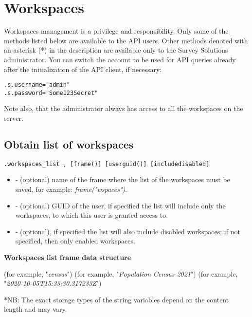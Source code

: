 \section{Workspaces}


Workspaces management is a privilege and responsibility. Only some of the
methods listed below are available to the API users. Other methods denoted
with an asterisk (*) in the description are available only to the Survey
Solutions administrator. You can switch the account to be used for API
queries already after the initialization of the API client, if necessary:

\vskip16pt

\begin{lstlisting}[style=CommandLineStyle]
.s.username="admin"
.s.password="Some123Secret"
\end{lstlisting}

Note also, that the administrator always has access to all the workspaces on
the server.


\subsection{Obtain list of workspaces}

\begin{lstlisting}[style=CommandLineStyle]
.workspaces_list , [frame()] [userguid()] [includedisabled]
\end{lstlisting}

\optsheader
\begin{itemize}
  \item {} - (optional) name of the frame where the list of the
        workspaces must be saved, for example: \textit{frame("wspaces")}.
  \item {} - (optional) GUID of the user, if specified the
        list will include only the workspaces, to which this user is granted
        access to.
  \item {} - (optional), if specified the list will also
        include disabled workspaces; if not specified, then only enabled
        workspaces.
\end{itemize}

\textbf{Workspaces list frame data structure}

\begin{compactitem}
     (for example, "\textit{census}")
     (for example, "\textit{Population Census 2021}")
     (for example, "\textit{2020-10-05T15:33:30.317233Z}")
\end{compactitem}
*NB: The exact storage types of the string variables depend on the content
     length and may vary.


